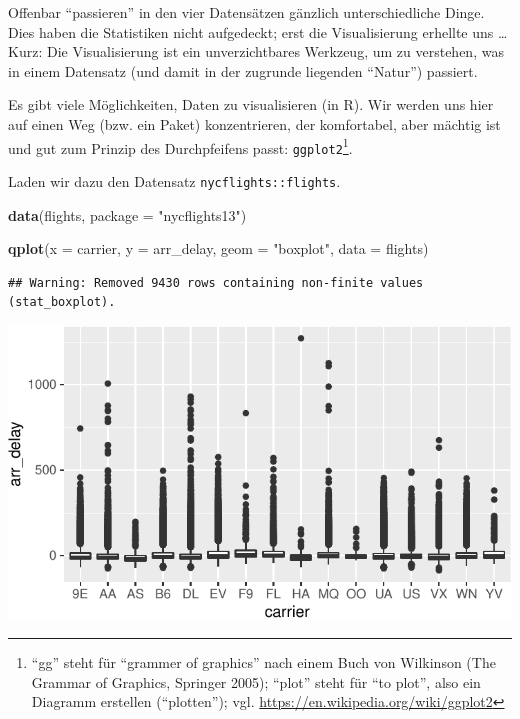 \documentclass[12pt,ngerman,paper=a4,pagesize,DIV=13]{scrreprt}
\newenvironment{Shaded}{\begin{snugshade}}{\end{snugshade}}
\newcommand{\DataTypeTok}[1]{\textcolor[rgb]{0.13,0.29,0.53}{#1}}
\newcommand{\KeywordTok}[1]{\textcolor[rgb]{0.13,0.29,0.53}{\textbf{#1}}}
\newcommand{\NormalTok}[1]{#1}
\newcommand{\StringTok}[1]{\textcolor[rgb]{0.31,0.60,0.02}{#1}}
\begin{document}
Offenbar \enquote{passieren} in den vier Datensätzen gänzlich
unterschiedliche Dinge. Dies haben die Statistiken nicht aufgedeckt;
erst die Visualisierung erhellte uns \dots Kurz: Die Visualisierung ist
ein unverzichtbares Werkzeug, um zu verstehen, was in einem Datensatz
(und damit in der zugrunde liegenden \enquote{Natur}) passiert.

Es gibt viele Möglichkeiten, Daten zu visualisieren (in R). Wir werden
uns hier auf einen Weg (bzw. ein Paket) konzentrieren, der komfortabel,
aber mächtig ist und gut zum Prinzip des Durchpfeifens passt:
\texttt{ggplot2}\footnote{\enquote{gg} steht für \enquote{grammer of
  graphics} nach einem Buch von Wilkinson (The Grammar of Graphics,
  Springer 2005); \enquote{plot} steht für \enquote{to plot}, also ein
  Diagramm erstellen (\enquote{plotten}); vgl.
  \url{https://en.wikipedia.org/wiki/ggplot2}}.

Laden wir dazu den Datensatz \texttt{nycflights::flights}.

\begin{Shaded}
\begin{Highlighting}[]
\KeywordTok{data}\NormalTok{(flights, }\DataTypeTok{package =} \StringTok{"nycflights13"}\NormalTok{)}
\end{Highlighting}
\end{Shaded}

\begin{Shaded}
\begin{Highlighting}[]
\KeywordTok{qplot}\NormalTok{(}\DataTypeTok{x =}\NormalTok{ carrier, }\DataTypeTok{y =}\NormalTok{ arr_delay, }\DataTypeTok{geom =} \StringTok{"boxplot"}\NormalTok{, }\DataTypeTok{data =}\NormalTok{ flights)}
\end{Highlighting}
\end{Shaded}

\begin{verbatim}
## Warning: Removed 9430 rows containing non-finite values (stat_boxplot).
\end{verbatim}

\includegraphics{DatenerhebungStatistik-Uebung_files/figure-latex/unnamed-chunk-236-1.pdf}
\end{document}
